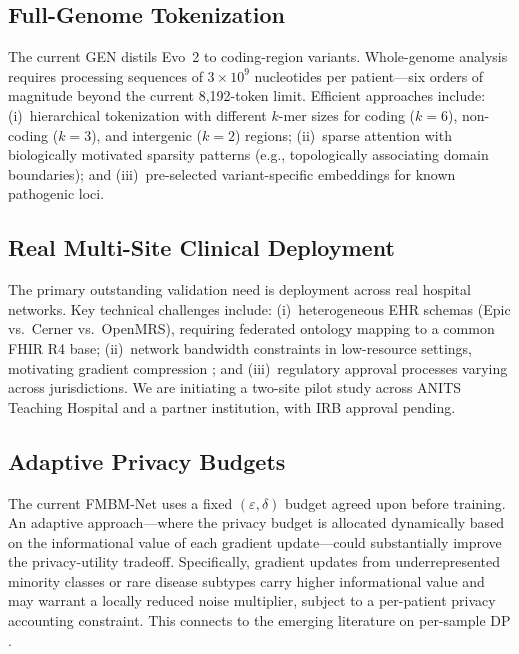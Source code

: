 \documentclass[a4paper,fleqn]{cas-dc}
\begin{document}
\subsection{Full-Genome Tokenization}

The current GEN distils Evo~2 \citep{evo2_2026} to coding-region variants.
Whole-genome analysis requires processing sequences of $3\!\times\!10^9$
nucleotides per patient---six orders of magnitude beyond the current 8,192-token
limit. Efficient approaches include: (i)~hierarchical tokenization with
different $k$-mer sizes for coding ($k\!=\!6$), non-coding ($k\!=\!3$), and
intergenic ($k\!=\!2$) regions; (ii)~sparse attention with biologically
motivated sparsity patterns (e.g., topologically associating domain boundaries);
and (iii)~pre-selected variant-specific embeddings for known pathogenic loci.

\subsection{Real Multi-Site Clinical Deployment}

The primary outstanding validation need is deployment across real hospital
networks. Key technical challenges include: (i)~heterogeneous EHR schemas
(Epic vs.\ Cerner vs.\ OpenMRS), requiring federated ontology mapping to
a common FHIR R4 base; (ii)~network bandwidth constraints in low-resource
settings, motivating gradient compression \citep{karimireddy2020scaffold};
and (iii)~regulatory approval processes varying across jurisdictions.
We are initiating a two-site pilot study across ANITS Teaching Hospital and
a partner institution, with IRB approval pending.

\subsection{Adaptive Privacy Budgets}

The current FMBM-Net uses a fixed $(\varepsilon,\delta)$ budget agreed upon
before training. An adaptive approach---where the privacy budget is allocated
dynamically based on the informational value of each gradient update---could
substantially improve the privacy-utility tradeoff. Specifically, gradient
updates from underrepresented minority classes or rare disease subtypes
carry higher informational value and may warrant a locally reduced noise
multiplier, subject to a per-patient privacy accounting constraint. This
connects to the emerging literature on per-sample DP \citep{gopi2021prv}.
\end{document}
